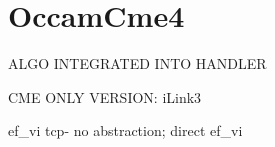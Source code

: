 \chapter{Occam\+Cme4}
\hypertarget{md__c_1_2_users_2sgaer_2source_2repos_2katanafinancial_2_occam_c_m_e4_2_occam_c_m_e4_2src_2_r_e_a_d_m_e}{}\label{md__c_1_2_users_2sgaer_2source_2repos_2katanafinancial_2_occam_c_m_e4_2_occam_c_m_e4_2src_2_r_e_a_d_m_e}
\label{md__c_1_2_users_2sgaer_2source_2repos_2katanafinancial_2_occam_c_m_e4_2_occam_c_m_e4_2src_2_r_e_a_d_m_e_autotoc_md9}%
%


ALGO INTEGRATED INTO HANDLER

CME ONLY VERSION\+: i\+Link3

ef\+\_\+vi tcp-\/ no abstraction; direct ef\+\_\+vi 